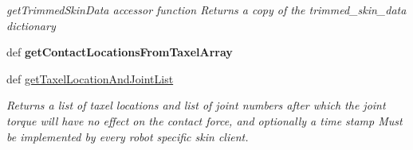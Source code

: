 \begin{DoxyCompactItemize}
\begin{DoxyCompactList}\small\item\em get\-Trimmed\-Skin\-Data accessor function \-Returns a copy of the trimmed\-\_\-skin\-\_\-data dictionary \end{DoxyCompactList}\item 
\hypertarget{classhrl__haptic__mpc_1_1skin__client_1_1_taxel_array_client_aa3da215578900e0cc80a69216ff48898}{def {\bfseries get\-Contact\-Locations\-From\-Taxel\-Array}}\label{classhrl__haptic__mpc_1_1skin__client_1_1_taxel_array_client_aa3da215578900e0cc80a69216ff48898}

\item 
def \hyperlink{classhrl__haptic__mpc_1_1skin__client_1_1_taxel_array_client_a63ddde9c6562d001a4c21a072b853003}{get\-Taxel\-Location\-And\-Joint\-List}
\begin{DoxyCompactList}\small\item\em \-Returns a list of taxel locations and list of joint numbers after which the joint torque will have no effect on the contact force, and optionally a time stamp \-Must be implemented by every robot specific skin client. \end{DoxyCompactList}\end{DoxyCompactItemize}
